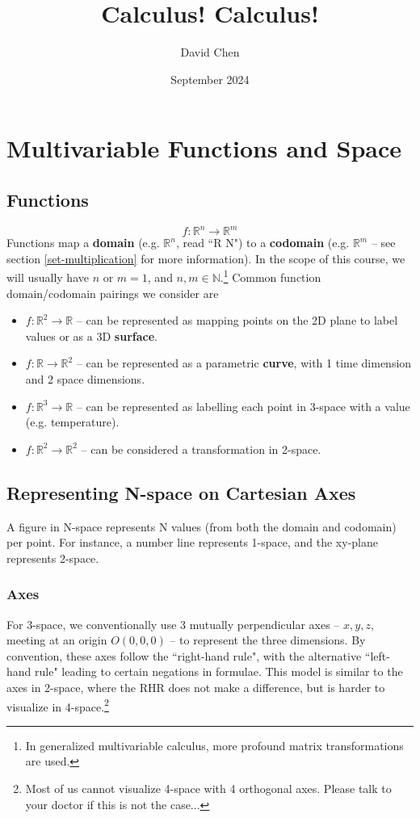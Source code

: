 \documentclass{article}
\title{Calculus! Calculus!}
\author{David Chen}
\date{September 2024}
\begin{document}
\maketitle

\section{Multivariable Functions and Space}

\subsection{Functions}
$$f: \mathbb{R}^n \to \mathbb{R}^m$$
Functions map a \textbf{domain} (e.g. $\mathbb{R}^n$, read ``R N") to a \textbf{codomain} (e.g. $\mathbb{R}^m$ -- see section \ref{set-multiplication} for more information). In the scope of this course, we will usually have $n$ or $m = 1$, and $n,m \in \mathbb{N}$.\footnote{In generalized multivariable calculus, more profound matrix transformations are used.}
Common function domain/codomain pairings we consider are
\begin{itemize}
    \item $f: \mathbb{R}^2 \to \mathbb{R}$ -- can be represented as mapping points on the 2D plane to label values or as a 3D \textbf{surface}.
    \item $f: \mathbb{R} \to \mathbb{R}^2$ -- can be represented as a parametric \textbf{curve}, with 1 time dimension and 2 space dimensions.
    \item $f: \mathbb{R}^3 \to \mathbb{R}$ -- can be represented as labelling each point in 3-space with a value (e.g. temperature).
    \item $f: \mathbb{R}^2 \to \mathbb{R}^2$ -- can be considered a transformation in 2-space.
\end{itemize}

\subsection{Representing N-space on Cartesian Axes}
A figure in N-space represents N values (from both the domain and codomain) per point. For instance, a number line represents 1-space, and the xy-plane represents 2-space.

\subsubsection{Axes}
For 3-space, we conventionally use 3 mutually perpendicular axes -- $x, y, z$, meeting at an origin $O(0,0,0)$ -- to represent the three dimensions. By convention, these axes follow the ``right-hand rule", with the alternative ``left-hand rule" leading to certain negations in formulae.
This model is similar to the axes in 2-space, where the RHR does not make a difference, but is harder to visualize in 4-space.\footnote{Most of us cannot visualize 4-space with 4 orthogonal axes. Please talk to your doctor if this is not the case...}
\end{document}
